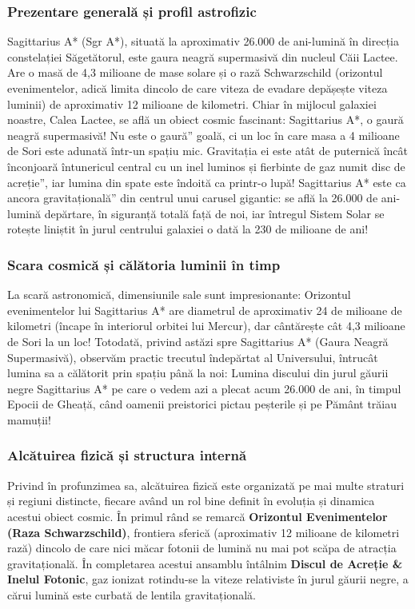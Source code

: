 \subsubsection*{Prezentare generală și profil astrofizic}
Sagittarius A* (Sgr A*), situată la aproximativ 26.000 de ani-lumină în direcția constelației Săgetătorul, este gaura neagră supermasivă din nucleul Căii Lactee. Are o masă de 4,3 milioane de mase solare și o rază Schwarzschild (orizontul evenimentelor, adică limita dincolo de care viteza de evadare depășește viteza luminii) de aproximativ 12 milioane de kilometri. Chiar în mijlocul galaxiei noastre, Calea Lactee, se află un obiect cosmic fascinant: Sagittarius A*, o gaură neagră supermasivă! Nu este o \quotedblbase{}gaură\textquotedblright{} goală, ci un loc în care masa a 4 milioane de Sori este adunată într-un spațiu mic. Gravitația ei este atât de puternică încât înconjoară întunericul central cu un inel luminos și fierbinte de gaz numit \quotedblbase{}disc de acreție\textquotedblright{}, iar lumina din spate este îndoită ca printr-o lupă! Sagittarius A* este ca \quotedblbase{}ancora gravitațională\textquotedblright{} din centrul unui carusel gigantic: se află la 26.000 de ani-lumină depărtare, în siguranță totală față de noi, iar întregul Sistem Solar se rotește liniștit în jurul centrului galaxiei o dată la 230 de milioane de ani!

\subsubsection*{Scara cosmică și călătoria luminii în timp}
La scară astronomică, dimensiunile sale sunt impresionante: Orizontul evenimentelor lui Sagittarius A* are diametrul de aproximativ 24 de milioane de kilometri (încape în interiorul orbitei lui Mercur), dar cântărește cât 4,3 milioane de Sori la un loc! Totodată, privind astăzi spre Sagittarius A* (Gaura Neagră Supermasivă), observăm practic trecutul îndepărtat al Universului, întrucât lumina sa a călătorit prin spațiu până la noi: Lumina discului din jurul găurii negre Sagittarius A* pe care o vedem azi a plecat acum 26.000 de ani, în timpul Epocii de Gheață, când oamenii preistorici pictau peșterile și pe Pământ trăiau mamuții!

\subsubsection*{Alcătuirea fizică și structura internă}
Privind în profunzimea sa, alcătuirea fizică este organizată pe mai multe straturi și regiuni distincte, fiecare având un rol bine definit în evoluția și dinamica acestui obiect cosmic. În primul rând se remarcă \textbf{Orizontul Evenimentelor (Raza Schwarzschild)}, frontiera sferică (aproximativ 12 milioane de kilometri rază) dincolo de care nici măcar fotonii de lumină nu mai pot scăpa de atracția gravitațională. În completarea acestui ansamblu întâlnim \textbf{Discul de Acreție \& Inelul Fotonic}, gaz ionizat rotindu-se la viteze relativiste în jurul găurii negre, a cărui lumină este curbată de lentila gravitațională.

